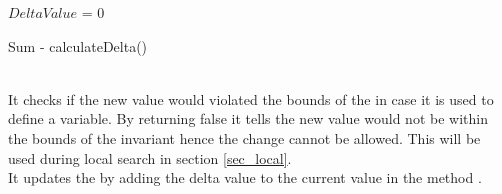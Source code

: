 \IncMargin{1em}
\begin{algorithm}[H]

  \algdata
{}
    \int $DeltaValue$ = 0 \;
     {
        \Return \false\;
    }\Else{
    \Return \true \;
    }
\caption{Sum - calculateDelta()} \label{algo_calcDelta} 
\end{algorithm} \noindent
\DecMargin{1em} \\
It checks if the new value would violated the bounds of the  in case it is used to define a variable. 
By returning false it tells the new value would not be within the bounds of the invariant hence the change cannot be 
allowed. This will 
be used during local search in section \ref{sec_local}. \\
It updates the by adding the delta value to the current value in the method .

